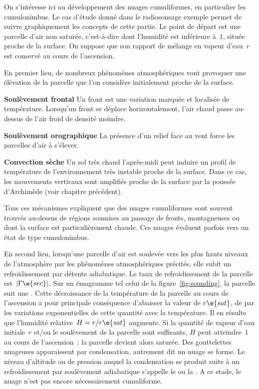\sk
On s'intéresse ici au développement des nuages cumuliformes, en particulier les cumulonimbus. Le cas d'étude donné dans le radiosonsage exemple permet de suivre graphiquement les concepts de cette partie. Le point de départ est une parcelle d'air non saturée, c'est-à-dire dont l'humidité est inférieure à~$1$, située proche de la surface. On suppose que son rapport de mélange en vapeur d'eau~$r$ est conservé au cours de l'ascension. 

\sk
En premier lieu, de nombreux phénomènes atmosphériques vont provoquer une élévation de la parcelle que l'on considère initialement proche de la surface.
\begin{citemize}
\item{\textbf{Soulèvement frontal}} Un front est une variation marquée et localisée de température. Lorsqu'un front se déplace horizontalement, l'air chaud passe au-dessus de l'air froid de densité moindre. 
\item{\textbf{Soulèvement orographique}} La présence d'un relief face au vent force les parcelles d'air à s'élever.
\item{\textbf{Convection sèche}} Un sol très chaud l'après-midi peut induire un profil de température de l'environnement très instable proche de la surface. Dans ce cas, les mouvements verticaux sont amplifiés proche de la surface par la poussée d'Archimède (voir chapitre précédent).
\end{citemize}
Tous ces mécanismes expliquent que des nuages cumuliformes sont souvent trouvés au-dessus de régions soumises au passage de fronts, montagneuses ou dont la surface est particulièrement chaude. Ces nuages évoluent parfois vers un état de type cumulonimbus.

\sk
En second lieu, lorsqu'une parcelle d'air est soulevée vers les plus hauts niveaux de l'atmosphère par les phénomènes atmosphériques précités, elle subit un refroidissement par détente adiabatique. Le taux de refroidissement de la parcelle est~$|\Gamma\e{sec}|$. Sur un émagramme tel celui de la figure~\ref{fig:sounding}, la parcelle suit une . Cette décroissance de la température de la parcelle au cours de l'ascension a pour principale conséquence d'abaisser la valeur de $r\e{sat}$, de par les variations exponentielles de cette quantité avec la température. Il en résulte que l'humidité relative~$H = r / r\e{sat}$ augmente. Si la quantité de vapeur d'eau initiale~$r$ et/ou le soulèvement de la parcelle sont suffisants, $H$ peut atteindre~$1$ au cours de l'ascension~: la parcelle devient alors saturée. Des gouttelettes nuageuses apparaissent par condensation, autrement dit un nuage se forme. Le niveau d'altitude ou de pression auquel la condensation se produit suite à un refroidissement par soulèvement adiabatique s'appelle le  ou la . A ce stade, le nuage n'est pas encore nécessairement cumuliforme.

